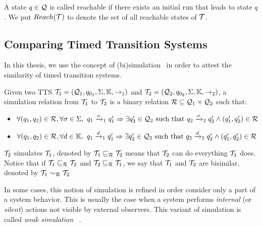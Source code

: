 A state $q\in\mathcal{Q}$ is called reachable if there exists an initial run
that leads to state $q$. We put $Reach(\mathcal{T})$ to denote the set of all 
reachable states of $\mathcal{T}$.
\subsection{Comparing Timed Transition Systems}
In this thesis, we use the concept of (bi)simulation~\cite{} 
in order to attest the similarity of timed transition systems.
\begin{definition}[Simulation]
  Given two TTS $\mathcal{T}_{1}=(\mathcal{Q}_{1},q_{0_{1}},\Sigma, \mathbb{K},\to_{1})$ and $\mathcal{T}_{2}=(\mathcal{Q}_{2},q_{0_{2}},\Sigma, \mathbb{K},\to_{2})$, a simulation relation from 
  $\mathcal{T}_1$ to $\mathcal{T}_2$ is a binary relation $\mathcal{R}\subseteq\mathcal{Q}_1
  \times\mathcal{Q}_2$ such that:
  \begin{itemize}
    \item $\forall(q_1,q_2)\in\mc{R},\forall\sigma\in\Sigma,\ 
      q_1\transitb{\sigma}{1}q_1'\Rightarrow\exists q'_2\in\mc{Q}_2 
      \text{ such that } q_2\transitb{\sigma}{2}q_2'\wedge
      (q_1',q_2')\in\mc{R}$
    \item $\forall(q_1,q_2)\in\mc{R},\forall d\in\mb{K},\ 
      q_1\transitb{d}{1}q_1'\Rightarrow\exists q'_2\in\mc{Q}_2 
      \text{ such that } q_2\transitb{d}{2}q_2'\wedge
      (q_1',q_2')\in\mc{R}$
  \end{itemize}
\end{definition}
  $\mathcal{T}_2$ simulates $\mathcal{T}_1$, denoted by $\mathcal{T}_1\sqsubseteq_{\mathcal{R}}\mathcal{T}_2$
  means that $\mathcal{T}_2$ can do everything $\mathcal{T}_1$ does. Notice that if
  $\mathcal{T}_1\sqsubseteq_{\mathcal{R}}\mathcal{T}_2$ and $\mathcal{T}_2\sqsubseteq_{\mathcal{R}}\mathcal{T}_1$,
  we say that $\mathcal{T}_1$ and $\mathcal{T}_2$ are bisimilar, denoted by
  $\mathcal{T}_1\sim_{\mathcal{R}}\mathcal{T}_2$   

In some cases, this notion of simulation is refined in order consider only
a part of a system behavior. This is usually the case when a system
performs \emph{internal} (or \emph{silent}) actions not visible by external
observers. This variant of simulation is called \emph{weak simulation}
~\cite{}.


